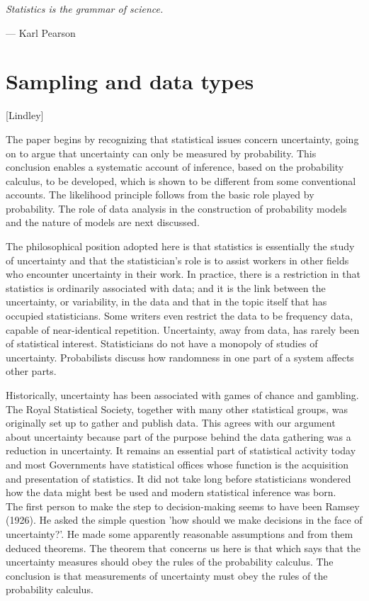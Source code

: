 \documentclass{book}
\begin{document}
\epigraph{\textit{Statistics is the grammar of science.}}{— Karl Pearson}

\section{Sampling and data types}
 
 [Lindley]
 
The paper begins by recognizing that statistical issues concern uncertainty, going on to argue that uncertainty can only be measured by probability. This conclusion enables a systematic account of inference, based on the probability calculus, to be developed, which is shown to be different from some conventional accounts. The likelihood principle follows from the basic role played by probability. The role of data analysis in the construction of probability models and the nature of models are next discussed.

\medskip

The philosophical position adopted here is that statistics is essentially the study of uncertainty and that the statistician's role is to assist workers in other fields who encounter uncertainty in their work. In practice, there is a restriction in that statistics is ordinarily associated with data; and it is the link between the uncertainty, or variability, in the data and that in the topic itself that has occupied statisticians. Some writers even restrict the data to be frequency data, capable of near-identical repetition. Uncertainty, away from data, has rarely been of statistical interest. Statisticians do not have a monopoly of studies of uncertainty. Probabilists discuss how randomness in one part of a system affects other parts.

\medskip

Historically, uncertainty has been associated with games of chance and gambling. The Royal Statistical Society, together with many other statistical groups, was originally set up
to gather and publish data. This agrees with our argument about uncertainty because part of the purpose behind the data gathering was a reduction in uncertainty. It remains an essential part of statistical activity today and most Governments have statistical offices whose function is the acquisition and presentation of statistics. It did not take long before statisticians wondered how the data might best be used and modern statistical inference was born.\\

The first person to make the step to decision-making seems to have been Ramsey (1926). He asked the simple question 'how should we make decisions in the face of uncertainty?'. He made some apparently reasonable assumptions and from them deduced theorems. The theorem that concerns us here is that which says that the uncertainty measures should obey the rules of the probability calculus. The conclusion is that measurements of uncertainty must obey the rules of the probability calculus.
\end{document}
